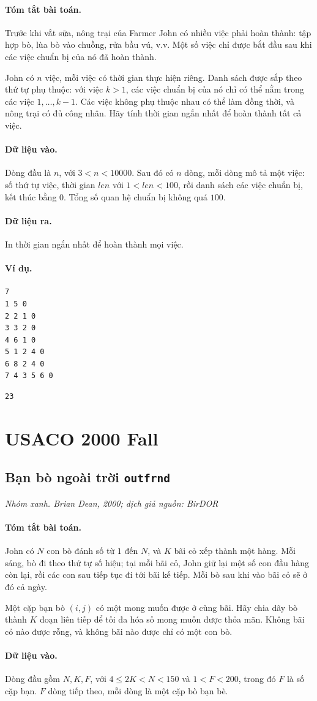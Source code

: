 \documentclass[11pt]{article}
\newcommand{\problem}[4]{%
  \subsection[#1 (#2)]{#1 \hfill {\normalsize\texttt{#2}}}%
  \noindent\textit{#3. #4}\par\smallskip
}
\newcommand{\iosec}[1]{\paragraph{#1}}
\begin{document}
\iosec{Tóm tắt bài toán.}
Trước khi vắt sữa, nông trại của Farmer John có nhiều việc phải hoàn thành:
tập hợp bò, lùa bò vào chuồng, rửa bầu vú, v.v. Một số việc chỉ được bắt đầu
sau khi các việc chuẩn bị của nó đã hoàn thành.

John có \(n\) việc, mỗi việc có thời gian thực hiện riêng. Danh sách được sắp
theo thứ tự phụ thuộc: với việc \(k>1\), các việc chuẩn bị của nó chỉ có thể
nằm trong các việc \(1,\ldots,k-1\). Các việc không phụ thuộc nhau có thể làm
đồng thời, và nông trại có đủ công nhân. Hãy tính thời gian ngắn nhất để hoàn
thành tất cả việc.

\iosec{Dữ liệu vào.}
Dòng đầu là \(n\), với \(3<n<10000\). Sau đó có \(n\) dòng, mỗi dòng mô tả một
việc: số thứ tự việc, thời gian \(\mathit{len}\) với \(1<\mathit{len}<100\),
rồi danh sách các việc chuẩn bị, kết thúc bằng \(0\). Tổng số quan hệ chuẩn bị
không quá \(100\).

\iosec{Dữ liệu ra.}
In thời gian ngắn nhất để hoàn thành mọi việc.

\iosec{Ví dụ.}
\begin{verbatim}
7
1 5 0
2 2 1 0
3 3 2 0
4 6 1 0
5 1 2 4 0
6 8 2 4 0
7 4 3 5 6 0
\end{verbatim}

\begin{verbatim}
23
\end{verbatim}

\section{USACO 2000 Fall}

\problem{Bạn bò ngoài trời}{outfrnd}{Nhóm xanh}{Brian Dean, 2000; dịch giả nguồn: BirDOR}

\iosec{Tóm tắt bài toán.}
John có \(N\) con bò đánh số từ \(1\) đến \(N\), và \(K\) bãi cỏ xếp thành một
hàng. Mỗi sáng, bò đi theo thứ tự số hiệu; tại mỗi bãi cỏ, John giữ lại một số
con đầu hàng còn lại, rồi các con sau tiếp tục đi tới bãi kế tiếp. Mỗi bò sau
khi vào bãi cỏ sẽ ở đó cả ngày.

Một cặp bạn bò \((i,j)\) có một mong muốn được ở cùng bãi. Hãy chia dãy bò
thành \(K\) đoạn liên tiếp để tối đa hóa số mong muốn được thỏa mãn. Không bãi
cỏ nào được rỗng, và không bãi nào được chỉ có một con bò.

\iosec{Dữ liệu vào.}
Dòng đầu gồm \(N,K,F\), với \(4\le 2K<N<150\) và \(1<F<200\), trong đó \(F\)
là số cặp bạn. \(F\) dòng tiếp theo, mỗi dòng là một cặp bò bạn bè.
\end{document}
